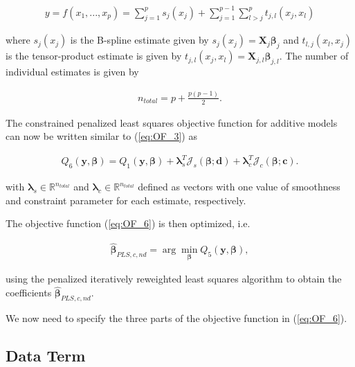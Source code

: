 \documentclass[10pt,a4paper]{article}
\begin{document}
	\begin{align} \label{eq:tps_all}
		y = f(x_1,..., x_p) = \sum_{j=1}^p s_j(x_j) + \sum_{j=1}^{p-1} \sum_{l>j}^p t_{j, l}(x_j, x_l)
	\end{align}
	
	where $s_j(x_j)$ is the B-spline estimate given by $s_j(x_j) = \boldsymbol{X}_j \boldsymbol{\beta}_j$ and $t_{l, j}(x_l,x_j)$ is the tensor-product estimate is given by $t_{j, l}(x_j,x_l) = \boldsymbol{X}_{j, l} \boldsymbol{\beta}_{j, l}$. The number of individual estimates is given by 
	
	\begin{align}
		n_{total} = p + \frac{p(p-1)}{2}.  
	\end{align}
	
	
	The constrained penalized least squares objective function for additive models can now be written similar to (\ref{eq:OF_3}) as
	
	\begin{align}\label{eq:OF_6}
		Q_6(\boldsymbol{y}, \boldsymbol{\beta}) = Q_1(\boldsymbol{y}, \boldsymbol{\beta}) + \boldsymbol{\lambda}_s^T	\boldsymbol{\mathcal{J}}_s(\boldsymbol{\beta}; \boldsymbol{d}) + \boldsymbol{\lambda}_c^T \boldsymbol{\mathcal{J}}_c(\boldsymbol{\beta}; \boldsymbol{c}).
	\end{align}
	
	with $\boldsymbol{\lambda}_s \in \mathbb{R}^{n_{total}}$ and  $\boldsymbol{\lambda}_c \in \mathbb{R}^{n_{total}}$  defined as vectors with one value of smoothness and constraint parameter for each estimate, respectively. 
	
	The objective function (\ref{eq:OF_6}) is then optimized, i.e.
	
	\begin{align}\label{eq:optimization_problem_6}
		\boldsymbol{\hat \beta}_{PLS,c,nd} = \arg \min_{\boldsymbol{\beta}} Q_5(\boldsymbol{y}, \boldsymbol{\beta}),
	\end{align}
	
	using the penalized iteratively reweighted least squares algorithm to obtain the coefficients $\boldsymbol{\hat{\beta}}_{PLS,c,nd}$. 
	
	We now need to specify the three parts of the objective function in (\ref{eq:OF_6}). 
	
	\subsection{Data Term}
		
\end{document}
